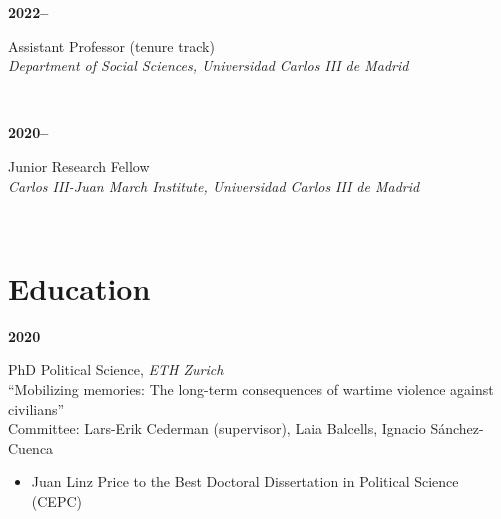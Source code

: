 \documentclass[a4paper, 12pt]{article}
\begin{document}
\begin{minipage}[t]{0.1\textwidth}
\textbf{2022--}
\end{minipage}\hfill\begin{minipage}[t]{0.9\textwidth}
Assistant Professor (tenure track)\\
\textit{Department of Social Sciences, Universidad Carlos III de Madrid}\\\vspace{-8pt}
\end{minipage}\\
\begin{minipage}[t]{0.1\textwidth}
\textbf{2020--}
\end{minipage}\hfill\begin{minipage}[t]{0.9\textwidth}
Junior Research Fellow\\
\textit{Carlos III-Juan March Institute, Universidad Carlos III de Madrid}\\\vspace{-8pt}
\end{minipage}\\

\vspace{-10pt}
\section*{Education}

\begin{minipage}[t]{0.1\textwidth}
  \flushleft
	\textbf{2020}
\end{minipage}
\begin{minipage}[t]{0.9\textwidth}
  PhD Political Science, \textit{ETH Zurich}\\
  {\small ``Mobilizing memories: The long-term consequences of wartime violence against civilians''}\vspace{-2pt}\\
  {\small Committee: Lars-Erik Cederman (supervisor), Laia Balcells, Ignacio Sánchez-Cuenca}
	\vspace{-5pt}
	\begin{itemize}\small
	  \item Juan Linz Price to the Best Doctoral Dissertation in Political Science (CEPC)
	\end{itemize}
\end{minipage}
\end{document}
